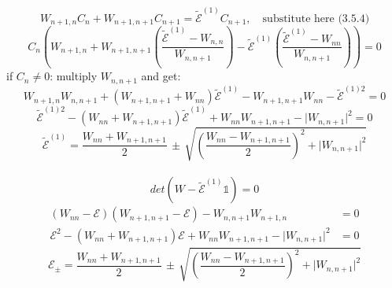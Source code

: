 \documentclass[12pt,fancychapters]{report}
\numberwithin{equation}{section}
\begin{document}
\[
  W_{n+1,n}C_n + W_{n+1,n+1}C_{n+1} = \tilde{\mathcal{E}}^{(1)}C_{n+1},\quad\text{substitute
  here (3.5.4)}
\]
\[
  C_n\left( W_{n+1,n} + W_{n+1, n+1}\left(\frac{\tilde{\mathcal{E}}^{(1)}-W_{n,n}}{W_{n,n+1}}
  \right)-\tilde{\mathcal{E}}^{(1)}\left(\frac{\tilde{\mathcal{E}}^{(1)}-W_{nn}}
{W_{n,n+1}}\right) \right) = 0
\]
if $C_n\neq 0$: multiply $W_{n,n+1}$ and get:
\[
  W_{n+1,n}W_{n,n+1}+\left(W_{n+1, n+1}+W_{nn} \right)\tilde{\mathcal{E}}^{(1)} - W_{n+1, n+1}
  W_{nn}-\tilde{\mathcal{E}}^{(1)2}=0
\]
\[
  \tilde{\mathcal{E}}^{(1)2} - \left(W_{nn}+W_{n+1,n+1} \right) \tilde{\mathcal{E}}^{(1)} + 
  W_{nn}W_{n+1,n+1} - \big|W_{n,n+1}\big|^2 = 0
\]
\begin{equation}
  \boxed{\tilde{\mathcal{E}}^{(1)} = \frac{W_{nn}+W_{n+1,n+1}}{2}\,\pm\, \sqrt{
      \left(\frac{W_{nn} - W_{n+1,n+1}}{2}\right)^2 + \big|W_{n,n+1}\big|^2
  }}
\end{equation}
\\
\begin{equation}
  det\left(W - \tilde{\mathcal{E}}^{(1)}\mathbb{1} \right)=0
\end{equation}
\begin{align*}
  \left(W_{nn}- \mathcal{E}\right)\left(W_{n+1,n+1} - \mathcal{E}\right) - W_{n,n+1}W_{n+1,n} &=0\\
  \mathcal{E}^2 - \left(W_{nn}+W_{n+1,n+1}\right)\mathcal{E}+W_{nn}W_{n+1,n+1}-\big|W_{n,n+1}
  \big|^2 &= 0
\end{align*}
\begin{equation}
  \boxed{\mathcal{E}_\pm = \frac{W_{nn}+W_{n+1,n+1}}{2}\,\pm\, \sqrt{
      \left(\frac{W_{nn} - W_{n+1,n+1}}{2}\right)^2 + \big|W_{n,n+1}\big|^2
  }}
\end{equation}
\end{document}
